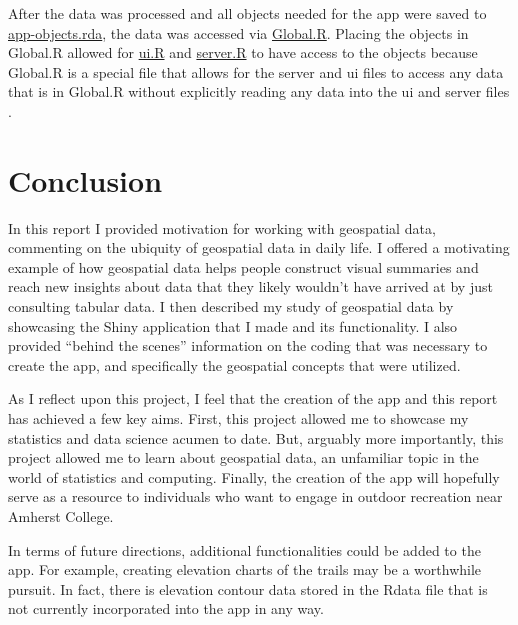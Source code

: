 \documentclass[12pt]{article}
\begin{document}
After the data was processed and all objects needed for the app were
saved to
\href{https://github.com/Amherst-STAT495F20/STAT495F20-project-Frontero/blob/main/shiny/app-objects.rda}{app-objects.rda},
the data was accessed via
\href{https://github.com/Amherst-STAT495F20/STAT495F20-project-Frontero/blob/main/shiny/Global.R}{Global.R}.
Placing the objects in Global.R allowed for
\href{https://github.com/Amherst-STAT495F20/STAT495F20-project-Frontero/blob/main/shiny/ui.R}{ui.R}
and
\href{https://github.com/Amherst-STAT495F20/STAT495F20-project-Frontero/blob/main/shiny/server.R}{server.R}
to have access to the objects because Global.R is a special file that
allows for the server and ui files to access any data that is in
Global.R without explicitly reading any data into the ui and server
files \citep{raessAwesomenessThatGlobal2018}.

\newpage

\hypertarget{conclusion}{%
\section{Conclusion}\label{conclusion}}

In this report I provided motivation for working with geospatial data,
commenting on the ubiquity of geospatial data in daily life. I offered a
motivating example of how geospatial data helps people construct visual
summaries and reach new insights about data that they likely wouldn't
have arrived at by just consulting tabular data. I then described my
study of geospatial data by showcasing the Shiny application that I made
and its functionality. I also provided ``behind the scenes'' information
on the coding that was necessary to create the app, and specifically the
geospatial concepts that were utilized.

As I reflect upon this project, I feel that the creation of the app and
this report has achieved a few key aims. First, this project allowed me
to showcase my statistics and data science acumen to date. But, arguably
more importantly, this project allowed me to learn about geospatial
data, an unfamiliar topic in the world of statistics and computing.
Finally, the creation of the app will hopefully serve as a resource to
individuals who want to engage in outdoor recreation near Amherst
College.

In terms of future directions, additional functionalities could be added
to the app. For example, creating elevation charts of the trails may be
a worthwhile pursuit. In fact, there is elevation contour data stored in
the Rdata file that is not currently incorporated into the app in any
way.
\end{document}
